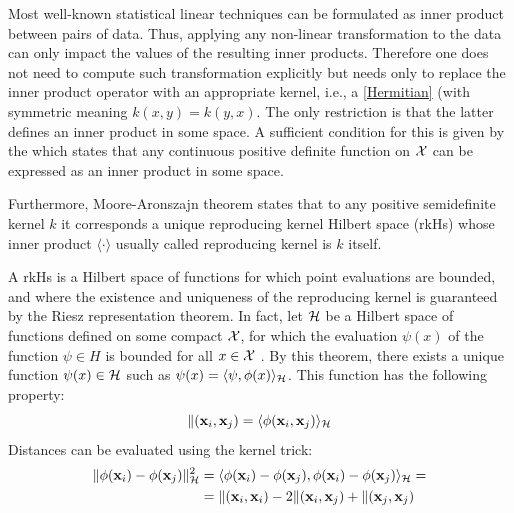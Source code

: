 Most  well-known statistical linear techniques can be formulated as inner product between pairs of data. Thus, applying any non-linear transformation to the data can only impact the values of the resulting inner products. Therefore one does not need to compute such transformation explicitly but needs only to replace the inner product operator with an appropriate kernel, i.e., a  \autoref{Hermitian} (with symmetric meaning $k(x,y) = k(y,x)$. The only restriction is that the latter defines an inner product in some space. A sufficient condition for this is given by the  which states that any continuous positive definite function on $\CMcal{X}$ can be expressed as an inner product in some space.

Furthermore, Moore-Aronszajn  theorem states that to any positive semidefinite kernel $k$ it corresponds  a unique reproducing kernel Hilbert space (rkHs)  whose inner product $\langle\cdot \rangle$ usually called reproducing kernel is $k$ itself.

A rkHs is a Hilbert space of functions for which point evaluations are bounded, and where the existence and uniqueness of the reproducing kernel is guaranteed by the Riesz representation theorem. In fact, let $\CMcal{H}$ be a Hilbert space of functions defined on some compact $\CMcal{X}$, for which the evaluation $\psi(x)$ of the function $\psi \in H$ is bounded for all $x \in \CMcal{X}$ . By this theorem, there exists a unique function $\psi(x) \in \CMcal{H}$ such as $\psi(x) = \langle\psi,\phi(x)\rangle_\CMcal{H}$. This function has the following property:
\begin{equation}
\label{EqProd}
\CMcal{k}(\x_i, \x_j) = \langle \phi(\x_i, \x_j) \rangle_\CMcal{H}
\end{equation}
Distances can be evaluated using the kernel trick:
\begin{equation}
\begin{aligned}
\| \phi(\x_i) - \phi(\x_j) \|^2_\CMcal{H} &= \langle \phi(\x_i)- \phi(\x_j),  \phi(\x_i)- \phi(\x_j)\rangle_\CMcal{H}  =\\
&=\CMcal{k}(\x_i, \x_i)- 2 \CMcal{k}(\x_i, \x_j)+\CMcal{k}(\x_j, \x_j)
\end{aligned}
\end{equation}

